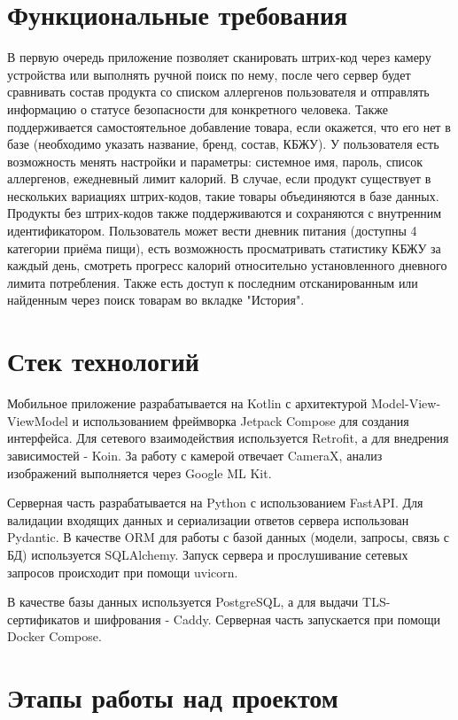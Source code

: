 \documentclass[14pt,a4paper]{extarticle}
\begin{document}
\section{Функциональные требования}

В первую очередь приложение позволяет сканировать штрих-код через камеру устройства или выполнять ручной поиск по нему, после чего сервер будет сравнивать состав продукта со списком аллергенов пользователя и отправлять информацию о статусе безопасности для конкретного человека. Также поддерживается самостоятельное добавление товара, если окажется, что его нет в базе (необходимо указать название, бренд, состав, КБЖУ). У пользователя есть возможность менять настройки и параметры: системное имя, пароль, список аллергенов, ежедневный лимит калорий. В случае, если продукт существует в нескольких вариациях штрих-кодов, такие товары объединяются в базе данных. Продукты без штрих-кодов также поддерживаются и сохраняются с внутренним идентификатором.
Пользователь может вести дневник питания (доступны 4 категории приёма пищи), есть возможность просматривать статистику КБЖУ за каждый день, смотреть прогресс калорий относительно установленного дневного лимита потребления. Также есть доступ к последним отсканированным или найденным через поиск товарам во вкладке "История".


\section{Стек технологий}

Мобильное приложение разрабатывается на Kotlin с архитектурой Model-View-ViewModel и использованием фреймворка Jetpack Compose для создания интерфейса. Для сетевого взаимодействия используется Retrofit, а для внедрения зависимостей - Koin. За работу с камерой отвечает CameraX, анализ изображений выполняется через Google ML Kit.

Серверная часть разрабатывается на Python с использованием FastAPI. Для валидации входящих данных и сериализации ответов сервера использован Pydantic. В качестве ORM для работы с базой данных (модели, запросы, связь с БД) используется SQLAlchemy. Запуск сервера и прослушивание сетевых запросов происходит при помощи uvicorn.

В качестве базы данных используется PostgreSQL, а для выдачи TLS-сертификатов и шифрования - Caddy.
Серверная часть запускается при помощи Docker Compose.


\section{Этапы работы над проектом}
\end{document}
